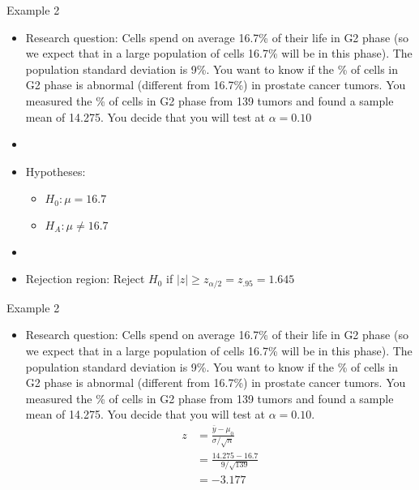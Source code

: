 \documentclass[xcolor=dvipsnames]{beamer}
\begin{document}
\begin{frame}{Example 2}
	\begin{itemize}
		\item Research question: Cells spend on average 16.7\% of their life in G2 phase (so we expect that in a large population of cells 16.7\% will be in this phase). The population standard deviation is 9\%. You want to know if the \% of cells in G2 phase is abnormal (different from 16.7\%) in prostate cancer tumors. You measured the \% of cells in G2 phase from 139 tumors and found a sample mean of 14.275. You decide that you will test at $\alpha = 0.10$  \pause
		\item[]
		\item Hypotheses:  \pause
		\begin{itemize}
			\item $H_0: \mu = 16.7$  \pause
			\item $H_A: \mu \neq 16.7$  \pause
		\end{itemize}
	\item[]
	\item Rejection region: Reject $H_0$ if $|z| \geq z_{\alpha / 2} = z_{.95} = 1.645$
	\end{itemize}
\end{frame}

\begin{frame}{Example 2}
	\begin{itemize}
		\item Research question: Cells spend on average 16.7\% of their life in G2 phase (so we expect that in a large population of cells 16.7\% will be in this phase). The population standard deviation is 9\%. You want to know if the \% of cells in G2 phase is abnormal (different from 16.7\%) in prostate cancer tumors. You measured the \% of cells in G2 phase from 139 tumors and found a sample mean of 14.275. You decide that you will test at $\alpha = 0.10$.
		\begin{align*}
			z &= \frac{\bar{y} - \mu_0}{\sigma / \sqrt{n}} \\
			&= \frac{14.275 - 16.7}{9 / \sqrt{139}} \\
			&= -3.177
		\end{align*}
	\end{itemize}
\end{frame}
\end{document}
